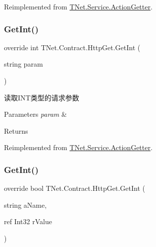 Reimplemented from \mbox{\hyperlink{class_t_net_1_1_service_1_1_action_getter_aceae772830322b5f8ab88b31d8b31835}{T\+Net.\+Service.\+Action\+Getter}}.

\mbox{\label{class_t_net_1_1_contract_1_1_http_get_a0a566eefd2751c74d79360fe8bfdb397}} 
\subsubsection{\texorpdfstring{Get\+Int()}{GetInt()}\hspace{0.1cm}{\footnotesize\ttfamily [1/5]}}
{\footnotesize\ttfamily override int T\+Net.\+Contract.\+Http\+Get.\+Get\+Int (\begin{DoxyParamCaption}\item[{string}]{param }\end{DoxyParamCaption})\hspace{0.3cm}{\ttfamily [virtual]}}



读取\+I\+N\+T类型的请求参数 


\begin{DoxyParams}{Parameters}
{\em param} & \\
\hline
\end{DoxyParams}
\begin{DoxyReturn}{Returns}

\end{DoxyReturn}


Reimplemented from \mbox{\hyperlink{class_t_net_1_1_service_1_1_action_getter_a1aee020aa39f0a8bdfc46d44ac43219b}{T\+Net.\+Service.\+Action\+Getter}}.

\mbox{\label{class_t_net_1_1_contract_1_1_http_get_ab550a50c4f847e11b4f14bbdcc8b53cf}} 
\subsubsection{\texorpdfstring{Get\+Int()}{GetInt()}\hspace{0.1cm}{\footnotesize\ttfamily [2/5]}}
{\footnotesize\ttfamily override bool T\+Net.\+Contract.\+Http\+Get.\+Get\+Int (\begin{DoxyParamCaption}\item[{string}]{a\+Name,  }\item[{ref Int32}]{r\+Value }\end{DoxyParamCaption})\hspace{0.3cm}{\ttfamily [virtual]}}



